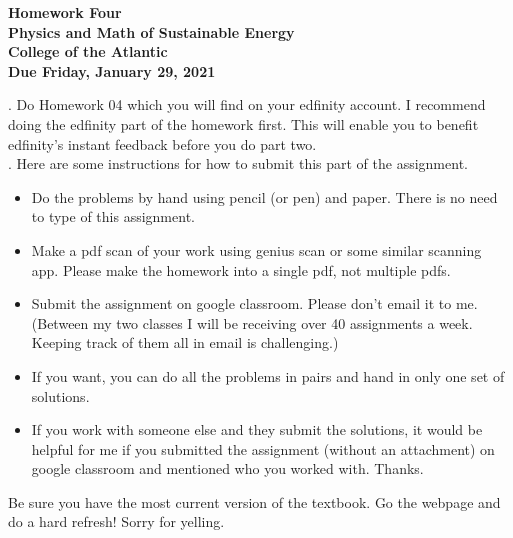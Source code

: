 \documentclass[12pt]{article}
\begin{document}
\pagestyle{empty}
 
\begin{center}
{\LARGE {\bf Homework Four}}\\
\bigskip
{\Large {\bf Physics and Math of Sustainable Energy}}\\
\bigskip
{\Large {\bf College of the Atlantic}}\\
\bigskip
{ {\bf Due Friday, January 29, 2021}}\\ 
\end{center}
\medskip



.  Do Homework 04 which you will find
on your edfinity account.  I recommend doing the edfinity part of the
homework first.  This will enable you to benefit edfinity's instant
feedback before you do part two.\\


.
Here are some 
instructions for how to submit this part of the assignment.
\begin{itemize}
\setlength{\itemsep}{0mm}
\item Do the problems by hand using pencil (or pen) and paper.
  There is no need to type of this assignment.
\item Make a pdf scan of your work using genius scan or some
  similar scanning app.  Please make the homework into a single
  pdf, not multiple pdfs. 
\item Submit the assignment on google classroom.  Please don't
  email it to me.  (Between my two classes I will be receiving
  over 40 assignments a week.  Keeping track of them all in email
  is challenging.)
\item If you want, you can do all the problems in pairs and hand
  in only one set of solutions.
\item If you work with someone else and they submit the solutions, it
  would be helpful for me if you submitted the assignment (without an
  attachment) on google classroom and mentioned who you worked with.
  Thanks. 

\end{itemize}


  Be sure you have the most
current version of the textbook.  Go the webpage and do a hard
refresh!  Sorry for yelling.\\ 
\end{document}
